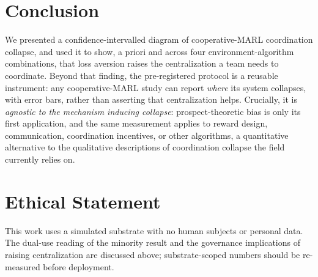 \documentclass[letterpaper]{article} %
\theoremstyle{plain}
\begin{document}
\section{Conclusion}
\label{sec:conclusion}

We presented a confidence-intervalled diagram of cooperative-MARL coordination
collapse, and used it to show, a priori and across four environment-algorithm combinations, that
loss aversion raises the centralization a team needs to coordinate. Beyond that finding, the
pre-registered protocol is a reusable instrument: any cooperative-MARL study can report \emph{where}
its system collapses, with error bars, rather than asserting that centralization helps. Crucially,
it is \emph{agnostic to the mechanism inducing collapse}: prospect-theoretic bias is only its first
application, and the same measurement applies to reward design, communication, coordination
incentives, or other algorithms, a quantitative alternative to the qualitative descriptions of
coordination collapse the field currently relies on.

\section*{Ethical Statement}

This work uses a simulated substrate with no human subjects or personal data. The dual-use reading
of the minority result and the governance implications of raising centralization are discussed
above; substrate-scoped numbers should be re-measured before deployment.


\end{document}
